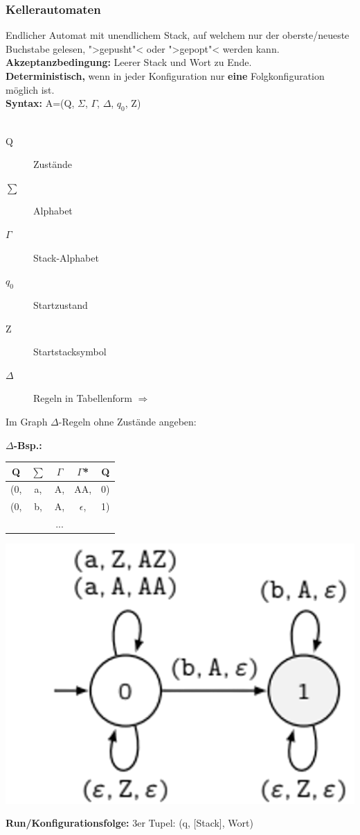 \documentclass[12pt,a4paper]{article}
\begin{document}
	\subsubsection{Kellerautomaten}
	Endlicher Automat mit unendlichem Stack, auf welchem nur der oberste/neueste Buchstabe gelesen, ">gepusht"< oder ">gepopt"< werden kann.\\
	\textbf{Akzeptanzbedingung: } Leerer Stack und Wort zu Ende.\\
	\textbf{Deterministisch, } wenn in jeder Konfiguration nur \textbf{eine} Folgkonfiguration möglich ist.\\
	\textbf{Syntax:} A=(Q, $\Sigma$, $\Gamma$, $\Delta$, $q_0$, Z)\\\\
	\begin{minipage}[c]{0.5\textwidth}
		\begin{description}
			\item[Q] Zustände
			\item[$\sum$] Alphabet
			\item[$\Gamma$] Stack-Alphabet
			\item[$q_0$] Startzustand
			\item[Z] Startstacksymbol  
			\item[$\Delta$] Regeln in Tabellenform $\Rightarrow$
		\end{description}
		Im Graph $\Delta$-Regeln ohne Zustände angeben:
	\end{minipage}
	\begin{minipage}[c]{0.5\textwidth}
		$\Delta$\textbf{-Bsp.:}\\
		\begin{tabular}[h]{c|c|c|c|c}
			Q & $\sum$ & $\Gamma$ & $\Gamma$* & Q\\
			\hline
			(0, & a, & A, & AA, & 0)\\
			(0, & b, & A, & $\epsilon$, & 1)\\
			&&...
		\end{tabular}
		\includegraphics[scale=0.3]{Bilder/KellerAutomat.png}
	\end{minipage}
	\vspace{.5cm}\newline
	\textbf{Run/Konfigurationsfolge:} 3er Tupel: (q, [Stack], Wort)
\end{document}
